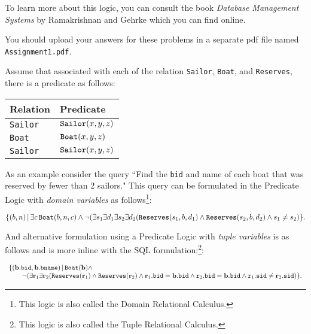 To learn more about this logic, you can consult the book \emph{Database Management Systems} by
Ramakrishnan and Gehrke which you can find online.

You should upload your answers for these problems in a separate pdf file named
{\tt Assignment1.pdf}.

Assume that associated with each of the relation {\tt Sailor}, {\tt Boat}, and {\tt Reserves}, there is a predicate as follows:

\begin{center}
\begin{tabular}{ll}
Relation & Predicate \\ \hline
{\tt Sailor} & ${\tt Sailor}(x,y,z)$ \\
{\tt Boat} & ${\tt Boat}(x,y,z)$ \\
{\tt Sailor} & ${\tt Sailor}(x,y,z)$ \\
\end{tabular}
\end{center}

As an example consider the query ``Find the {\tt bid} and name of each boat that was reserved by fewer than
2 sailors."
This query can be formulated in the Predicate Logic with \emph{domain variables} as follows\footnote{This logic is
also called the Domain Relational Calculus.}:


\[\{
(b,n) \,|\, \exists c\, {\tt Boat}(b,n,c) \land 
\lnot(\exists s_1\exists d_1\exists s_2\exists d_2({\tt Reserves}(s_1,b,d_1)\land {\tt Reserves}(s_2,b,d_2)\land s_1\neq s_2)
\}.\]


And alternative formulation using a Predicate Logic with \emph{tuple variables} is as follows and is more inline with the
SQL formulation:\footnote{This logic is
also called the Tuple Relational Calculus.}:

{\small
\[
\begin{array}{ll}
\{({\bf b}.{\tt bid},{\bf b}.{\tt bname}) \,|\, {\tt Boat}({\bf b}) \land \\
\qquad\lnot(\exists {\bf r}_1\exists {\bf r}_2({\tt Reserves}({\bf r}_1)\land {\tt Reserves}({\bf r}_2)
\land {\bf r}_1.{\tt bid} = {\bf b}.{\tt bid} \land {\tt r}_2.{\tt bid} = {\bf b}.{\tt bid} \land {\tt r}_1.{\tt sid} \neq {\bf r}_2.{\tt sid})\}.
\end{array}
\]
}


